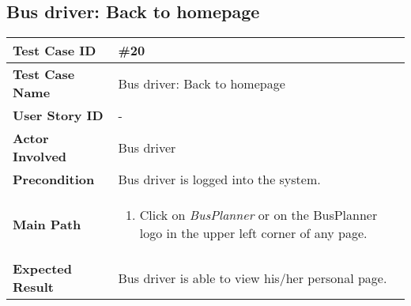 \subsection{Bus driver: Back to homepage}
\begin{center}
	\begin{tabular} { | m{3.5cm} | m{9.5cm} | }
		\hline
		\textbf{Test Case ID} & \#20\\
		\hline
		\textbf{Test Case Name} & Bus driver: Back to homepage\\
		\hline
		\textbf{User Story ID} & - \\
		\hline
		\textbf{Actor Involved} & Bus driver\\
		\hline
		\textbf{Precondition} & Bus driver is logged into the system.\\
		\hline
		\textbf{Main Path} & 
		\begin{enumerate}
			\item Click on \textit{BusPlanner} or on the BusPlanner logo in the upper left corner of any page.
		\end{enumerate}\\
		\hline
		\textbf{Expected Result} & Bus driver is able to view his/her personal page.\\
		\hline
	\end{tabular}
\end{center}